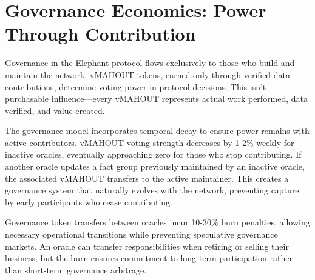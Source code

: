 \section{Governance Economics: Power Through Contribution}

Governance in the Elephant protocol flows exclusively to those who build and maintain the network. vMAHOUT tokens, earned only through verified data contributions, determine voting power in protocol decisions. This isn't purchasable influence—every vMAHOUT represents actual work performed, data verified, and value created.

The governance model incorporates temporal decay to ensure power remains with active contributors. vMAHOUT voting strength decreases by 1-2\% weekly for inactive oracles, eventually approaching zero for those who stop contributing. If another oracle updates a fact group previously maintained by an inactive oracle, the associated vMAHOUT transfers to the active maintainer. This creates a governance system that naturally evolves with the network, preventing capture by early participants who cease contributing.

Governance token transfers between oracles incur 10-30\% burn penalties, allowing necessary operational transitions while preventing speculative governance markets. An oracle can transfer responsibilities when retiring or selling their business, but the burn ensures commitment to long-term participation rather than short-term governance arbitrage.

